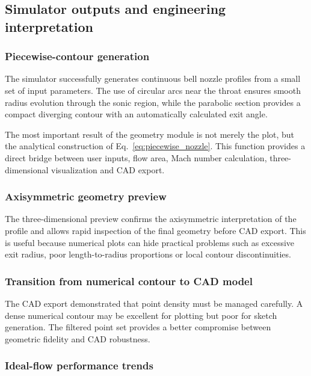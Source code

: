 \documentclass[11pt,a4paper]{article}
\begin{document}
\subsection{Simulator outputs and engineering interpretation}

\subsubsection{Piecewise-contour generation}

The simulator successfully generates continuous bell nozzle profiles from a small set of input parameters. The use of circular arcs near the throat ensures smooth radius evolution through the sonic region, while the parabolic section provides a compact diverging contour with an automatically calculated exit angle.

The most important result of the geometry module is not merely the plot, but the analytical construction of Eq.~\eqref{eq:piecewise_nozzle}. This function provides a direct bridge between user inputs, flow area, Mach number calculation, three-dimensional visualization and CAD export.

\subsubsection{Axisymmetric geometry preview}

The three-dimensional preview confirms the axisymmetric interpretation of the profile and allows rapid inspection of the final geometry before CAD export. This is useful because numerical plots can hide practical problems such as excessive exit radius, poor length-to-radius proportions or local contour discontinuities.

\subsubsection{Transition from numerical contour to CAD model}

The CAD export demonstrated that point density must be managed carefully. A dense numerical contour may be excellent for plotting but poor for sketch generation. The filtered point set provides a better compromise between geometric fidelity and CAD robustness.

\subsubsection{Ideal-flow performance trends}
\end{document}
